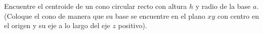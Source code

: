 \item Encuentre el centroide de un cono circular recto con altura $h$ y radio de la base $a$. (Coloque el cono de manera que su base se encuentre en el plano $xy$ con centro en el origen y su eje a lo largo del eje $z$ positivo).
